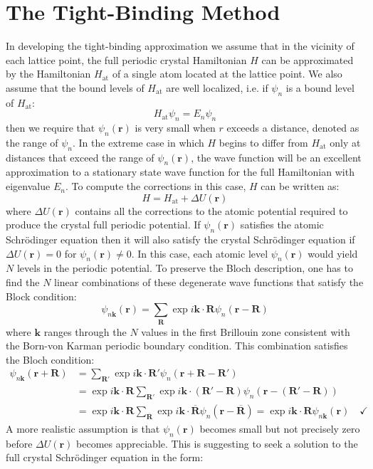 \documentclass[10.75pt,a4paper,openright,bottom=2cm]{article}
\renewcommand{\Vec}[1]{\boldsymbol{#1}}
\begin{document}
\section{The Tight-Binding Method}
In developing the tight-binding approximation we assume that in the vicinity of each lattice point, the full periodic crystal Hamiltonian $H$ can be approximated by the Hamiltonian $H_{\text{at}}$ of a single atom located at the lattice point. We also assume that the bound levels of $H_{\text{at}}$ are well localized, i.e. if $\psi_n$ is a bound level of $H_{\text{at}}$:
\[
H_{\text{at}}\psi_n=E_n\psi_n
\]
then we require that $\psi_n(\Vec{r})$ is very small when $r$ exceeds a distance, denoted as the range of $\psi_n$. In the extreme case in which $H$ begins to differ from $H_{\text{at}}$ only at distances that exceed the range of $\psi_n(\Vec{r})$, the wave function will be an excellent approximation to a stationary state wave function for the full Hamiltonian with eigenvalue $E_n$. To compute the corrections in this case, $H$ can be written as:
\[
H=H_{\text{at}}+\Delta U(\Vec{r})
\]
where $\Delta U(\Vec{r})$ contains all the corrections to the atomic potential required to produce the crystal full periodic potential. If $\psi_n(\Vec{r})$ satisfies the atomic Schr\"odinger equation then it will also satisfy the crystal Schr\"odinger equation if $\Delta U(\Vec{r})=0$ for $\psi_n(\Vec{r})\neq0$. In this case, each atomic level $\psi_n(\Vec{r})$ would yield $N$ levels in the periodic potential. To preserve the Bloch description, one has to find the $N$ linear combinations of these degenerate wave functions that satisfy the Block condition:
\[
\psi_{n\Vec{k}}(\Vec{r})=\sum_{\Vec{R}}\exp{i\Vec{k}\cdot\Vec{R}}\psi_n(\Vec{r}-\Vec{R})
\]
where $\Vec{k}$ ranges through the $N$ values in the first Brillouin zone consistent with the Born-von Karman periodic boundary condition. This combination satisfies the Bloch condition:
\begin{align*}
\psi_{n\Vec{k}}(\Vec{r}+\Vec{R})&=\sum_{\Vec{R'}}\exp{i\Vec{k}\cdot\Vec{R'}}\psi_n(\Vec{r}+\Vec{R}-\Vec{R'})\\
&=\exp{i\Vec{k}\cdot\Vec{R}}\sum_{\Vec{R'}}\exp{i\Vec{k}\cdot(\Vec{R'}-\Vec{R})}\psi_n(\Vec{r}-(\Vec{R'}-\Vec{R}))\\
&=\exp{i\Vec{k}\cdot\Vec{R}}\sum_{\Vec{\overline{R}}}\exp{i\Vec{k}\cdot\Vec{\overline{R}}}\psi_n(\Vec{r}-\Vec{\overline{R}})=\exp{i\Vec{k}\cdot\Vec{R}}\psi_{n\Vec{k}}(\Vec{r}) \quad \checkmark
\end{align*}
A more realistic assumption is that $\psi_n(\Vec{r})$ becomes small but not precisely zero before $\Delta U(\Vec{r})$ becomes appreciable. This is suggesting to seek a solution to the full crystal Schr\"odinger equation in the form:
\end{document}
